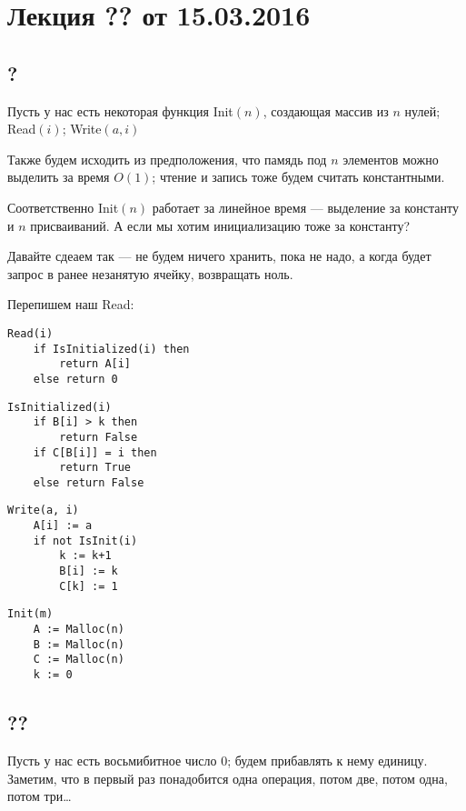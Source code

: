 



\section*{Лекция ?? от 15.03.2016}

\subsection{?}

Пусть у нас есть некоторая функция Init$(n)$, создающая массив из $n$ нулей;
Read$(i)$;
Write$(a, i)$

Также будем исходить из предположения, что памядь под $n$ элементов можно выделить за время $O(1)$; чтение и запись тоже будем считать константными.

Соответственно Init$(n)$ работает за линейное время --- выделение за константу и $n$ присваиваний. А если мы хотим инициализацию тоже за константу?

Давайте сдеаем так --- не будем ничего хранить, пока не надо, а когда будет запрос в ранее незанятую ячейку, возвращать ноль.

Перепишем наш Read:

\begin{lstlisting}
Read(i)
    if IsInitialized(i) then
        return A[i]
    else return 0
\end{lstlisting}

\begin{lstlisting}
IsInitialized(i)
    if B[i] > k then 
        return False
    if C[B[i]] = i then
        return True
    else return False
\end{lstlisting}

\begin{lstlisting}
Write(a, i)
    A[i] := a
    if not IsInit(i)
        k := k+1
        B[i] := k
        C[k] := 1
\end{lstlisting}

\begin{lstlisting}
Init(m)
    A := Malloc(n)
    B := Malloc(n)
    C := Malloc(n)
    k := 0
\end{lstlisting}

\subsection{??}

Пусть у нас есть восьмибитное число 0; будем прибавлять к нему единицу. Заметим, что в первый раз понадобится одна операция, потом две, потом одна, потом три\ldots

